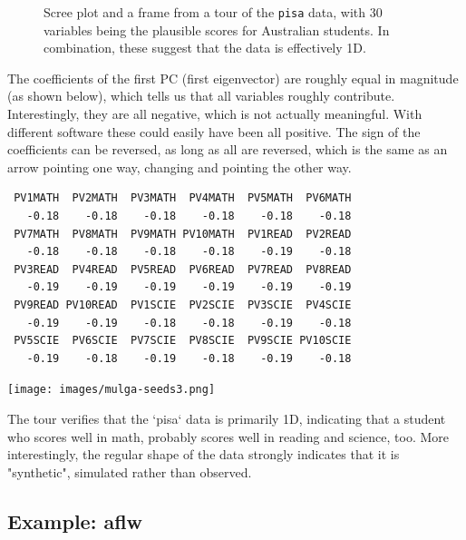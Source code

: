 \documentclass[
  letterpaper,
]{krantz}
\newenvironment{Shaded}{\begin{snugshade}}{\end{snugshade}}
\newcommand{\DecValTok}[1]{\textcolor[rgb]{0.68,0.00,0.00}{#1}}
\newcommand{\FunctionTok}[1]{\textcolor[rgb]{0.28,0.35,0.67}{#1}}
\newcommand{\NormalTok}[1]{\textcolor[rgb]{0.00,0.23,0.31}{#1}}
\newcommand{\SpecialCharTok}[1]{\textcolor[rgb]{0.37,0.37,0.37}{#1}}
\newcommand{\insightbox}[1]{%
\noindent\colorbox{insight!30}{%
\begin{minipage}{0.98\textwidth}%
    \centering%
    \begin{minipage}[c]{0.15\textwidth} %
      \texttt{[image: images/mulga-seeds3.png]} %
    \end{minipage}%
    \hfill %
    \begin{minipage}[c]{0.8\textwidth} %
      \bigskip%
      \textsf{#1}%
      \bigskip%
    \end{minipage}%
    \hspace*{3mm}%
  \end{minipage}%
}%
}
\begin{document}
\begin{figure}
\begin{minipage}{0.50\linewidth}
{}


\end{minipage}%

\caption{\label{fig-pisa-pca-pdf}Scree plot and a frame from a tour of
the \texttt{pisa} data, with 30 variables being the plausible scores for
Australian students. In combination, these suggest that the data is
effectively 1D.}

\end{figure}%

The coefficients of the first PC (first eigenvector) are roughly equal
in magnitude (as shown below), which tells us that all variables roughly
contribute. Interestingly, they are all negative, which is not actually
meaningful. With different software these could easily have been all
positive. The sign of the coefficients can be reversed, as long as all
are reversed, which is the same as an arrow pointing one way, changing
and pointing the other way.

\begin{Shaded}
\end{Shaded}

\begin{verbatim}
 PV1MATH  PV2MATH  PV3MATH  PV4MATH  PV5MATH  PV6MATH 
   -0.18    -0.18    -0.18    -0.18    -0.18    -0.18 
 PV7MATH  PV8MATH  PV9MATH PV10MATH  PV1READ  PV2READ 
   -0.18    -0.18    -0.18    -0.18    -0.19    -0.18 
 PV3READ  PV4READ  PV5READ  PV6READ  PV7READ  PV8READ 
   -0.19    -0.19    -0.19    -0.19    -0.19    -0.19 
 PV9READ PV10READ  PV1SCIE  PV2SCIE  PV3SCIE  PV4SCIE 
   -0.19    -0.19    -0.18    -0.18    -0.19    -0.18 
 PV5SCIE  PV6SCIE  PV7SCIE  PV8SCIE  PV9SCIE PV10SCIE 
   -0.19    -0.18    -0.19    -0.18    -0.19    -0.18 
\end{verbatim}

\insightbox{The tour verifies that the `pisa` data is primarily 1D, indicating that a student who scores well in math, probably scores well in reading and science, too. More interestingly, the regular shape of the data strongly indicates that it is "synthetic", simulated rather than observed.}

\subsection{Example: aflw}\label{example-aflw}
\end{document}
